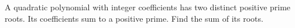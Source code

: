 A quadratic polynomial with integer coefficients has two distinct positive prime roots. Its coefficients sum to a positive prime. Find the sum of its roots.
